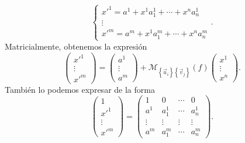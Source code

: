\[
\begin{cases}
x'^{1} = a^{1}+x^{1}a^{1}_{1} + \cdots + x^{n}a^{1}_{n} \\
\vdots \\
x'^{m} = a^{m}+x^{1}a^{m}_{1} + \cdots + x^{n}a^{m}_{n}
\end{cases}
.\]
Matricialmente, obtenemos la expresión
\[\begin{pmatrix} x'^{1} \\ \vdots \\ x'^{m} \end{pmatrix} = \begin{pmatrix} a^{1} \\ \vdots \\ a^{m} \end{pmatrix} + \mathcal{M}_{ \left\{ \vec{u}_{i}\right\} \left\{ \vec{v}_{j}\right\} }\left(f\right) \begin{pmatrix} x^{1} \\ \vdots \\ x^{n} \end{pmatrix} .\]
También lo podemos expresar de la forma
\[ \begin{pmatrix} 1 \\ x'^{1} \\ \vdots \\ x'^{m} \end{pmatrix} = \begin{pmatrix} 1 & 0 & \cdots & 0 \\
a^{1} & a^{1}_{1} & \cdots & a^{1}_{n} \\
\vdots & \vdots & \vdots & \vdots \\
a^{m} & a^{m}_{1} & \cdots & a^{m}_{n}\end{pmatrix} .\]


